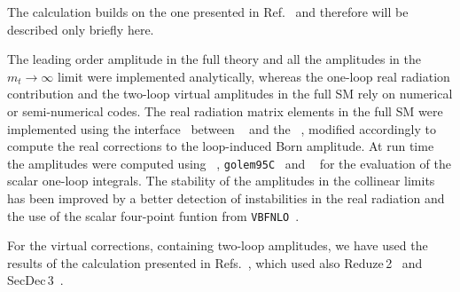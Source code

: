 The calculation builds on the one presented in Ref.~\cite{Heinrich:2017kxx} and therefore will be described only briefly here. 

The leading order amplitude in the full theory and  all the
amplitudes in the $m_t\to\infty$ limit were implemented analytically, whereas the
one-loop real radiation contribution and the two-loop virtual
amplitudes in the full SM rely on numerical or semi-numerical
codes.
The real radiation matrix elements in the full SM were implemented
using the interface~\cite{Luisoni:2013cuh}
between \gosam~\cite{Cullen:2011ac,Cullen:2014yla} and
the \powhegbox~\cite{Nason:2004rx,Frixione:2007vw,Alioli:2010xd}, modified
accordingly to compute the real corrections to the loop-induced Born amplitude. 
 At run time the amplitudes were computed using
\ninja{}~\cite{Peraro:2014cba},  {\tt golem95C}~\cite{Binoth:2008uq,Cullen:2011kv} and \avholo{}~\cite{vanHameren:2010cp}
for the evaluation of the scalar one-loop integrals.
The stability of the amplitudes in the collinear limits has been improved by a better detection of instabilities in the real radiation 
and the use of the scalar four-point funtion from {\tt VBFNLO}~\cite{Arnold:2008rz,Baglio:2014uba}.

For the virtual corrections, containing two-loop amplitudes, we have used the results of the
calculation presented in Refs.~\cite{Borowka:2016ehy,Borowka:2016ypz},
which used also {\sc Reduze}\,2~\cite{vonManteuffel:2012np} and {\sc
 SecDec}\,3~\cite{Borowka:2015mxa}.

